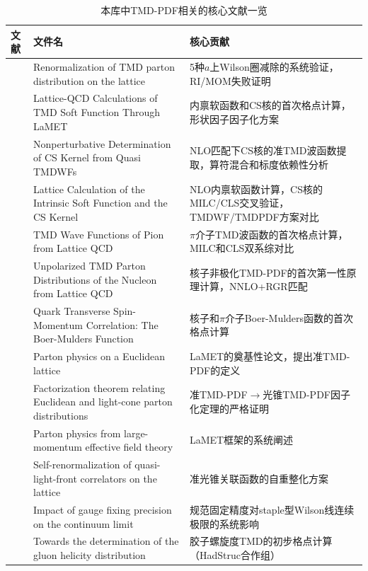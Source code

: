 \documentclass[12pt,a4paper]{ctexart}
\theoremstyle{definition}
\begin{document}
\begin{table}[H]
\centering
\caption{本库中TMD-PDF相关的核心文献一览}
\label{tab:TMD_papers}
\small
\begin{tabular}{lp{5cm}l}
\toprule
文献 & 文件名 & 核心贡献 \\
\midrule
\cite{Zhang2022renormTMD} & Renormalization of TMD parton distribution on the lattice &
5种$a$上Wilson圈减除的系统验证，RI/MOM失败证明 \\

\cite{LPC2020soft} & Lattice-QCD Calculations of TMD Soft Function Through LaMET &
内禀软函数和CS核的首次格点计算，形状因子因子化方案 \\

\cite{Chu2022CSkernel} & Nonperturbative Determination of CS Kernel from Quasi TMDWFs &
NLO匹配下CS核的准TMD波函数提取，算符混合和标度依赖性分析 \\

\cite{Chu2023soft} & Lattice Calculation of the Intrinsic Soft Function and the CS Kernel &
NLO内禀软函数计算，CS核的MILC/CLS交叉验证，TMDWF/TMDPDF方案对比 \\

\cite{Chu2023TMDWF} & TMD Wave Functions of Pion from Lattice QCD &
$\pi$介子TMD波函数的首次格点计算，MILC和CLS双系综对比 \\

\cite{He2024unpolTMD} & Unpolarized TMD Parton Distributions of the Nucleon from Lattice QCD &
核子非极化TMD-PDF的首次第一性原理计算，NNLO+RGR匹配 \\

\cite{Ma2025BoerMulders} & Quark Transverse Spin-Momentum Correlation: The Boer-Mulders Function &
核子和$\pi$介子Boer-Mulders函数的首次格点计算 \\

\cite{Ji2013Euclidean} & Parton physics on a Euclidean lattice &
LaMET的奠基性论文，提出准TMD-PDF的定义 \\

\cite{Izubuchi2018} & Factorization theorem relating Euclidean and light-cone parton distributions &
准TMD-PDF$\to$光锥TMD-PDF因子化定理的严格证明 \\

\cite{Ji2014LaMET} & Parton physics from large-momentum effective field theory &
LaMET框架的系统阐述 \\

\cite{Huo2021self} & Self-renormalization of quasi-light-front correlators on the lattice &
准光锥关联函数的自重整化方案 \\

\cite{Zhang2024gauge_fixing} & Impact of gauge fixing precision on the continuum limit &
规范固定精度对staple型Wilson线连续极限的系统影响 \\

\cite{Egerer2022} & Towards the determination of the gluon helicity distribution &
胶子螺旋度TMD的初步格点计算（HadStruc合作组）\\
\bottomrule
\end{tabular}
\end{table}
\end{document}
